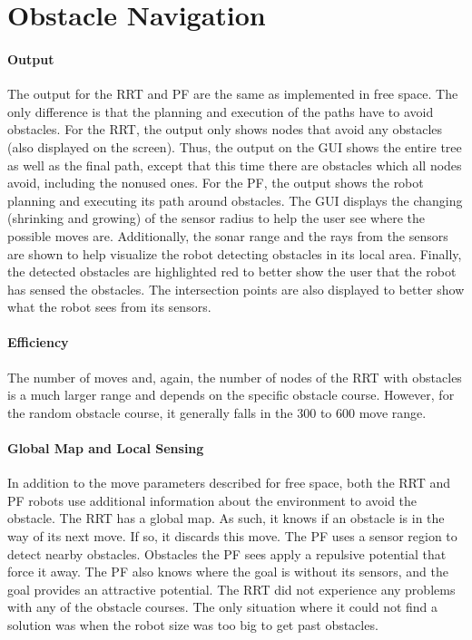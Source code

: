 \documentclass[12pt]{article}
\begin{document}
\section{Obstacle Navigation}
\paragraph*{Output}
The output for the RRT and PF are the same as implemented in free space. The only difference is that the planning and execution of the paths have to avoid obstacles. For the RRT, the output only shows nodes that avoid any obstacles (also displayed on the screen). Thus, the output on the GUI shows the entire tree as well as the final path, except that this time there are obstacles which all nodes avoid, including the nonused ones. For the PF, the output shows the robot planning and executing its path around obstacles. The GUI displays the changing (shrinking and growing) of the sensor radius to help the user see where the possible moves are. Additionally, the sonar range and the rays from the sensors are shown to help visualize the robot detecting obstacles in its local area. Finally, the detected obstacles are highlighted red to better show the user that the robot has sensed the obstacles. The intersection points are also displayed to better show what the robot sees from its sensors.

\paragraph*{Efficiency}
The number of moves and, again, the number of nodes of the RRT with obstacles is a much larger range and depends on the specific obstacle course. However, for the random obstacle course, it generally falls in the 300 to 600 move range.

\paragraph*{Global Map and Local Sensing}
In addition to the move parameters described for free space, both the RRT and PF robots use additional information about the environment to avoid the obstacle. The RRT has a global map. As such, it knows if an obstacle is in the way of its next move. If so, it discards this move. The PF uses a sensor region to detect nearby obstacles. Obstacles the PF sees apply a repulsive potential that force it away. The PF also knows where the goal is without its sensors, and the goal provides an attractive potential. The RRT did not experience any problems with any of the obstacle courses. The only situation where it could not find a solution was when the robot size was too big to get past obstacles. 
\end{document}
